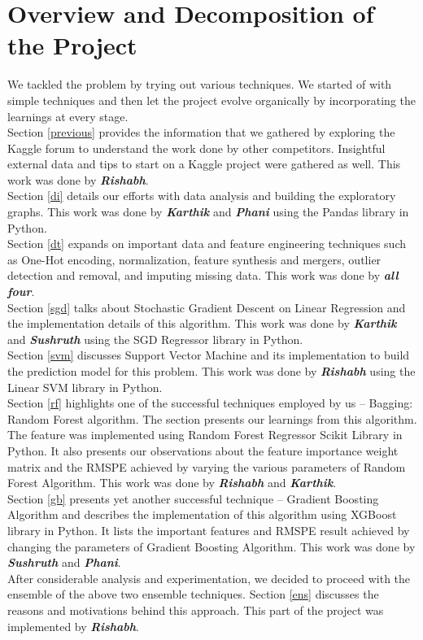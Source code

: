 \documentclass[12pt,a4paper]{article}
\begin{document}
\section{Overview and Decomposition of the Project}
We tackled the problem by trying out various techniques. We started of with simple techniques and then let the project evolve organically by incorporating the learnings at every stage.\\

Section \ref{previous} provides the information that we gathered by exploring the Kaggle forum to understand the work done by other competitors. Insightful external data and tips to start on a Kaggle project were gathered as well. This work was done by \textbf{\textit{Rishabh}}.\\
Section \ref{di} details our efforts with data analysis and building the exploratory graphs. This work was done by \textbf{\textit{Karthik}} and \textbf{\textit{Phani}} using the Pandas library\cite{pandas} in Python.\\
Section \ref{dt} expands on important data and feature engineering techniques such as One-Hot encoding, normalization, feature synthesis and mergers, outlier detection and removal, and imputing missing data. This work was done by \textbf{\textit{all four}}.\\
Section \ref{sgd} talks about Stochastic Gradient Descent on Linear Regression and the implementation details of this algorithm. This work was done by \textbf{\textit{Karthik}} and \textbf{\textit{Sushruth}} using the SGD Regressor library\cite{sgdlib} in Python.\\
Section \ref{svm} discusses Support Vector Machine and its implementation to build the prediction model for this problem. This work was done by \textbf{\textit{Rishabh}} using the Linear SVM library\cite{svrlib} in Python.\\
Section \ref{rf} highlights one of the successful techniques employed by us --  Bagging: Random Forest algorithm. The section presents our learnings from this algorithm. The feature was implemented using Random Forest Regressor Scikit Library\cite{rfr} in Python. It also presents our observations about the feature importance weight matrix and the RMSPE achieved by varying the various parameters of Random Forest Algorithm. This work was done by \textbf{\textit{Rishabh}} and \textbf{\textit{Karthik}}.\\
Section \ref{gb} presents yet another successful technique -- Gradient Boosting Algorithm and describes the implementation of this algorithm using XGBoost library\cite{github_xgb} in Python. It lists the important features and RMSPE result achieved by changing the parameters of Gradient Boosting Algorithm. This work was done by \textbf{\textit{Sushruth}} and \textbf{\textit{Phani}}. \\
After considerable analysis and experimentation, we decided to proceed with the ensemble of the above two ensemble techniques. Section \ref{ens} discusses the reasons and motivations behind this approach. This part of the project was implemented by \textbf{\textit{Rishabh}}.
\end{document}
